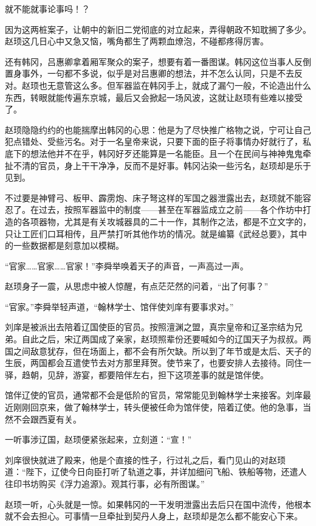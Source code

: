 就不能就事论事吗！？

因为这两桩案子，让朝中的新旧二党彻底的对立起来，弄得朝政不知耽搁了多少。赵顼这几日心中又急又恼，嘴角都生了两颗血燎泡，不碰都疼得厉害。

还有韩冈，吕惠卿拿着厢军聚众的案子，想要有着一番图谋。韩冈这位当事人反倒置身事外，一句都不多说，似乎是对吕惠卿的想法，并不怎么认同，只是不去反对。赵顼也无意管这么多。但军器监在韩冈手上，就成了漏勺一般，不论造出什么东西，转眼就能传遍东京城，最后又会掀起一场风波，这就让赵顼有些难以接受了。

赵顼隐隐约约的也能揣摩出韩冈的心思：他是为了尽快推广格物之说，宁可让自己犯点错处、受些污名。对于一名皇帝来说，只要下面的臣子将事情办好就行了，私底下的想法他并不在乎，韩冈好歹还能算是一名能臣。且一个在民间与神神鬼鬼牵扯不清的官员，身上干干净净，反而不是好事。韩冈沾染一些污名，赵顼却是乐于见到。

不过要是神臂弓、板甲、霹雳炮、床子弩这样的军国之器泄露出去，赵顼就不能容忍了。在过去，按照军器监中的制度——甚至在军器监成立之前——各个作坊中打造的各项器物，尤其是有关攻城器具的二十一作，其制作之法，都是不立文字的，只让工匠们口耳相传，且严禁打听其他作坊的情况。就是编纂《武经总要》，其中的一些数据都是刻意加以模糊。

“官家……官家……官家！”李舜举唤着天子的声音，一声高过一声。

赵顼身子一震，从思虑中被人惊醒，有点茫茫然的问着，“出了何事？”

“官家。”李舜举轻声道，“翰林学士、馆伴使刘庠有要事求对。”

刘庠是被派出去陪着辽国使臣的官员。按照澶渊之盟，真宗皇帝和辽圣宗结为兄弟。自此之后，宋辽两国成了亲家，赵顼照辈份还要喊如今的辽国天子为叔叔。两国之间敌意犹存，但在场面上，都不会有所欠缺。所以到了年节或是太后、天子的生辰，两国都会互遣使节去对方那里拜贺。使节来了，也要安排人去接待。同住一驿，趋朝，见辞，游宴，都要陪伴左右，担下这项差事的就是馆伴使。

馆伴辽使的官员，通常都不会是低阶的官员，常常能见到翰林学士来接客。刘庠最近刚刚回京来，做了翰林学士，转头便被任命为馆伴使，陪着辽使。他的急事，当然不会跟西夏有关。

一听事涉辽国，赵顼便紧张起来，立刻道：“宣！”

刘庠很快就进了殿来，他是个直接的性子，行过礼之后，看门见山的对赵顼道：“陛下，辽使今日向臣打听了轨道之事，并详加细问飞船、铁船等物，还遣人往印书坊购买《浮力追源》。观其行事，必有所图谋。”

赵顼一听，心头就是一惊。如果韩冈的一干发明泄露出去后只在国中流传，他根本就不会去担心。可事情一旦牵扯到契丹人身上，赵顼却是怎么都不能安心下来。

